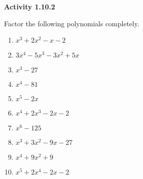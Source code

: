\vspace{0.3ex}
\noindent\textbf{Activity 1.10.2}

\vspace{0.2ex}

Factor the following polynomials completely.
\begin{multicols}{2}
\begin{enumerate}
    \item $x^3 + 2x^2 - x - 2$
    \item $3x^4 - 5x^3 - 3x^2 + 5x$
    \item $x^3 - 27$
    \item $x^4 - 81$
    \item $x^5 - 2x$
    \item $x^4 + 2x^3 - 2x - 2$
    \item $x^6 - 125$
    \item $x^3 + 3x^2 - 9x - 27$
    \item $x^4 + 9x^2 + 9$
    \item $x^5 + 2x^4 - 2x - 2$
\end{enumerate}
\end{multicols}
